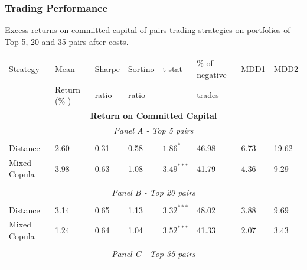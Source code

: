 \documentclass[pdf,10pt,xcolor=dvipsnames,hide notes]{beamer}
\begin{document}
	\begin{frame}
		
		
		\frametitle{Trading Performance}
			\begin{threeparttable}[H]
			\centering \tiny
			\caption{Excess returns on committed capital of pairs trading strategies on portfolios of Top 5, 20 and 35 pairs after costs. }
			\begin{tabularx}{\textwidth}{@{\extracolsep{\fill}}llllllll@{}}
				\toprule
				Strategy & Mean  & Sharpe & Sortino & t-stat & \% of negative   & MDD1 & MDD2 \\
				& Return (\% ) & ratio &  ratio     &  &  trades     &       &  \\
				\midrule
				\multicolumn{8}{c}{\textbf{Return on Committed Capital}} \\
				\multicolumn{8}{c}{\textit{Panel A - Top 5 pairs}} \\
				&       &       &       &       &       &       &  \\
				Distance & 2.60  & 0.31  & 0.58  & $1.86^{*}$  & 46.98 & 6.73    & 19.62 \\
				Mixed Copula & \cellcolor{corn} 3.98  & \cellcolor{corn} 0.63  & 1.08  & \cellcolor{corn} $3.49^{***}$  & \cellcolor{corn} 41.79 & \cellcolor{corn} 4.36  & \cellcolor{corn} 9.29 \\
				\multicolumn{1}{r}{} & \multicolumn{1}{r}{} & \multicolumn{1}{r}{} & \multicolumn{1}{r}{} & \multicolumn{1}{r}{} & \multicolumn{1}{r}{} & \multicolumn{1}{r}{} & \multicolumn{1}{r}{} \\
				\multicolumn{8}{c}{\textit{Panel B - Top 20 pairs}} \\
				&       &       &       &       &       &       &  \\
				Distance & \cellcolor{celadon} 3.14  & \cellcolor{celadon} 0.65  & 1.13  & $3.32^{***}$  & 48.02 & 3.88  & 9.69 \\
				Mixed Copula  & 1.24  & 0.64  & 1.04  & $3.52^{***}$  & 41.33 & \cellcolor{corn} 2.07  & \cellcolor{corn} 3.43  \\
				\multicolumn{1}{r}{} & \multicolumn{1}{r}{} & \multicolumn{1}{r}{} & \multicolumn{1}{r}{} & \multicolumn{1}{r}{} & \multicolumn{1}{r}{} & \multicolumn{1}{r}{} & \multicolumn{1}{r}{} \\
				\multicolumn{8}{c}{\textit{Panel C - Top 35 pairs}} \\
				&       &       &       &       &       &       &  \\

\end{tabularx}
\end{threeparttable}
\end{frame}
\end{document}
